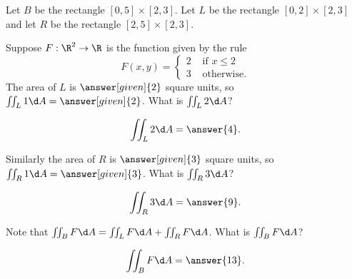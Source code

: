 \documentclass{ximera}
\author{Jim Fowler}
\begin{document}
\begin{exercise}
  Let $B$ be the rectangle $[0,5] \times [2,3]$.  Let $L$ be the rectangle $[0,2] \times [2,3]$ and let $R$ be the rectangle $[2,5] \times [2,3]$.

  Suppose $F : \R^2 \to \R$ is the function given by the rule
  \[
    F(x,y) = \begin{cases}
      2 & \mbox{ if $x \leq 2$} \\
      3 & \mbox{ otherwise.}
    \end{cases}
  \]
  The area of $L$ is $\answer[given]{2}$ square units, so $\iint_L 1 \d A = \answer[given]{2}$.  
  What is $\iint_L 2 \d A$?
  \begin{prompt}
    \[
      \iint_L 2 \d A = \answer{4}.
    \]
  \end{prompt}    

  Similarly the area of $R$ is $\answer[given]{3}$ square units, so $\iint_R 1 \d A = \answer[given]{3}$.  
  What is $\iint_R 3 \d A$?
  \begin{prompt}
    \[
      \iint_R 3 \d A = \answer{9}.
    \]
  \end{prompt}

  Note that $\iint_B F \d A = \iint_L F \d A + \iint_R F \d A$.  What is $\iint_B F \d A$?
  \begin{prompt}
    \[
      \iint_B F \d A = \answer{13}.
    \]
  \end{prompt}

\end{exercise}
\end{document}
